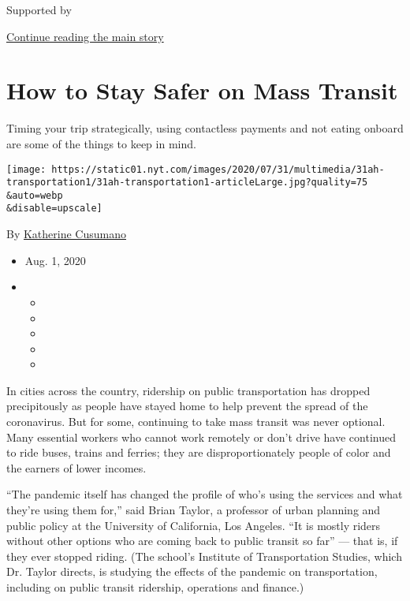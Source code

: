 Supported by

\protect\hyperlink{after-sponsor}{Continue reading the main story}

\hypertarget{how-to-stay-safer-on-mass-transit}{%
\section{How to Stay Safer on Mass
Transit}\label{how-to-stay-safer-on-mass-transit}}

Timing your trip strategically, using contactless payments and not
eating onboard are some of the things to keep in mind.

\texttt{[image: https://static01.nyt.com/images/2020/07/31/multimedia/31ah-transportation1/31ah-transportation1-articleLarge.jpg?quality=75\\\&auto=webp\\\&disable=upscale]}

By \href{https://www.nytimes.com/by/katherine-cusumano}{Katherine
Cusumano}

\begin{itemize}
\item
  Aug. 1, 2020
\item
  \begin{itemize}
  \item
  \item
  \item
  \item
  \item
  \end{itemize}
\end{itemize}

In cities across the country, ridership on public transportation has
dropped precipitously as people have stayed home to help prevent the
spread of the coronavirus. But for some, continuing to take mass transit
was never optional. Many essential workers who cannot work remotely or
don't drive have continued to ride buses, trains and ferries; they are
disproportionately people of color and the earners of lower incomes.

``The pandemic itself has changed the profile of who's using the
services and what they're using them for,'' said Brian Taylor, a
professor of urban planning and public policy at the University of
California, Los Angeles. ``It is mostly riders without other options who
are coming back to public transit so far'' --- that is, if they ever
stopped riding. (The school's Institute of Transportation Studies, which
Dr. Taylor directs, is studying the effects of the pandemic on
transportation, including on public transit ridership, operations and
finance.)

